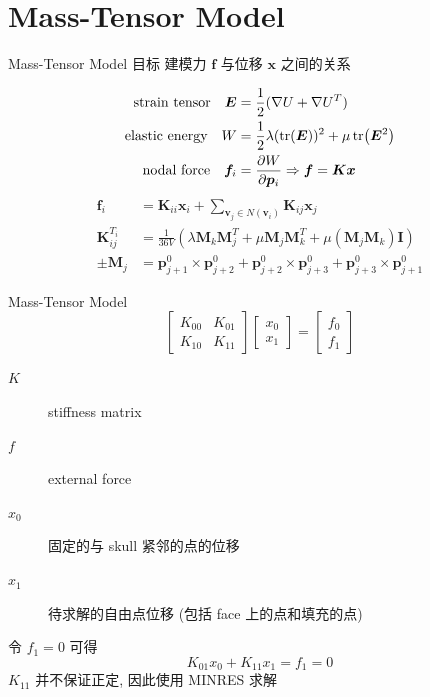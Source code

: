 \documentclass{beamer}
\begin{document}
\section{Mass-Tensor Model}

\begin{frame}{Mass-Tensor Model}
  \textcolor{tsinghua}{目标} 建模力 $\bm{f}$ 与位移 $\bm{x}$ 之间的关系

  \begin{align*}
    \text{strain tensor} \quad \bm{E} & = \frac{1}{2} (\nabla U + \nabla U^T)                     \\
    \text{elastic energy} \quad W     & = \frac{1}{2} \lambda (\tr(\bm{E}))^2 + \mu \tr(\bm{E}^2) \\
    \text{nodal force} \quad \bm{f}_i & = \pdv{W}{\bm{p}_i} \Rightarrow \bm{f} = \bm{K} \bm{x}
  \end{align*}
  \begin{align*}
    \bm{f}_i          & = \bm{K}_{ii} \bm{x}_i + \sum_{\bm{v}_j \in N(\bm{v}_i)} \bm{K}_{ij} \bm{x}_j                                                    \\
    \bm{K}_{ij}^{T_i} & = \frac{1}{36 V} (\lambda \bm{M}_k \bm{M}_j^T + \mu \bm{M}_j \bm{M}_k^T + \mu (\bm{M}_j \bm{M}_k) \bm{I})                        \\
    \pm \bm{M}_j      & = \bm{p}_{j + 1}^0 \times \bm{p}_{j + 2}^0 + \bm{p}_{j + 2}^0 \times \bm{p}_{j + 3}^0 + \bm{p}_{j + 3}^0 \times \bm{p}_{j + 1}^0
  \end{align*}
\end{frame}

\begin{frame}{Mass-Tensor Model}
  \begin{equation*}
    \begin{bmatrix}
      K_{00} & K_{01} \\
      K_{10} & K_{11}
    \end{bmatrix}
    \begin{bmatrix}
      x_0 \\
      x_1
    \end{bmatrix}
    =
    \begin{bmatrix}
      f_0 \\
      f_1
    \end{bmatrix}
  \end{equation*}
  \begin{description}
    \item[$K$] stiffness matrix
    \item[$f$] external force
    \item[$x_0$] 固定的与 skull 紧邻的点的位移
    \item[$x_1$] 待求解的自由点位移 (包括 face 上的点和填充的点)
  \end{description}
  令 $f_1 = 0$ 可得
  \begin{equation*}
    K_{01} x_0 + K_{11} x_1 = f_1 = 0
  \end{equation*}
  $K_{11}$ 并不保证正定, 因此使用 MINRES 求解
\end{frame}
\end{document}

